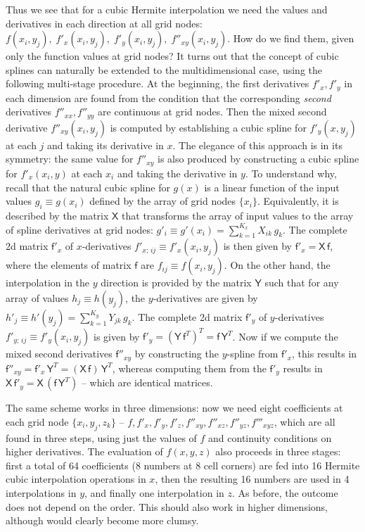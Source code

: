 \documentclass[12pt]{article}
\begin{document}
Thus we see that for a cubic Hermite interpolation we need the values and derivatives in each direction at all grid nodes: $f(x_i, y_j),\; f'_x(x_i, y_j),\; f'_y(x_i, y_j),\; f''_{xy}(x_i, y_j)$. How do we find them, given only the function values at grid nodes? It turns out that the concept of cubic splines can naturally be extended to the multidimensional case, using the following multi-stage procedure. At the beginning, the first derivatives $f'_x, f'_y$ in each dimension are found from the condition that the corresponding \textit{second} derivatives $f''_{xx}, f''_{yy}$ are continuous at grid nodes. Then the mixed second derivative $f''_{xy}(x_i, y_j)$ is computed by establishing a cubic spline for $f'_y(x, y_j)$ at each $j$ and taking its derivative in $x$. The elegance of this approach is in its symmetry: the same value for $f''_{xy}$ is also produced by constructing a cubic spline for $f'_x(x_i, y)$ at each $x_i$ and taking the derivative in $y$. To understand why, recall that the natural cubic spline for $g(x)$ is a linear function of the input values $g_i\equiv g(x_i)$ defined by the array of grid nodes $\{x_i\}$. Equivalently, it is described by the matrix $\mathsf{X}$ that transforms the array of input values to the array of spline derivatives at grid nodes: $g'_i\equiv g'(x_i) = \sum_{k=1}^{K_x} X_{ik}\,g_k$. The complete 2d matrix $\mathsf{f}'_x$ of $x$-derivatives $f'_{x;\,ij} \equiv f'_x(x_i, y_j)$ is then given by $\mathsf{f}'_x = \mathsf{X\,f}$, where the elements of matrix $\mathsf{f}$ are $f_{ij} \equiv f(x_i, y_j)$. On the other hand, the interpolation in the $y$ direction is provided by the matrix $\mathsf{Y}$ such that for any array of values $h_j\equiv h(y_j)$, the $y$-derivatives are given by $h'_j\equiv h'(y_j) = \sum_{k=1}^{K_y} Y_{jk}\,g_k$. The complete 2d matrix $\mathsf{f}'_y$ of $y$-derivatives $f'_{y;\,ij} \equiv f'_y(x_i, y_j)$ is given by $\mathsf{f}'_y = (\mathsf{Y}\,\mathsf{f}^T)^T = \mathsf{f\,Y}^T$. Now if we compute the mixed second derivatives $\mathsf{f}''_{xy}$ by constructing the $y$-spline from $\mathsf{f}'_x$, this results in $\mathsf{f}''_{xy} = \mathsf{f}'_x\,\mathsf{Y}^T = (\mathsf{X\,f})\,\mathsf{Y}^T$, whereas computing them from the $\mathsf{f}'_y$ results in $\mathsf{X\,f}'_y = \mathsf{X}\,(\mathsf{f\,Y}^T)$ -- which are identical matrices.

The same scheme works in three dimensions: now we need eight coefficients at each grid node $\{x_i,y_j,z_k\}$ -- $f, f'_x, f'_y, f'_z, f''_{xy}, f''_{xz}, f''_{yz}, f'''_{xyz}$, which are all found in three steps, using just the values of $f$ and continuity conditions on higher derivatives. The evaluation of $f(x,y,z)$ also proceeds in three stages: first a total of 64 coefficients (8 numbers at 8 cell corners) are fed into 16 Hermite cubic interpolation operations in $x$, then the resulting 16 numbers are used in 4 interpolations in $y$, and finally one interpolation in $z$. As before, the outcome does not depend on the order. This should also work in higher dimensions, although would clearly become more clumsy.
\end{document}
